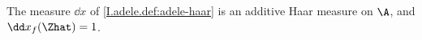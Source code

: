 The measure $\dd x$ of \cref{I.adele.def:adele-haar} is an additive Haar measure on $\A$, and $\dd x_f(\Zhat)=1$.
